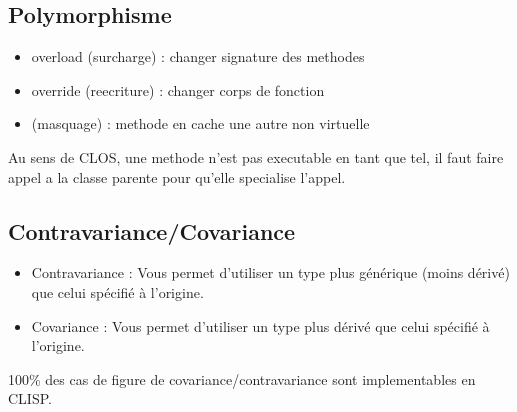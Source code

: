 \documentclass[a4paper,11pt]{article}
\begin{document}
\subsection{Polymorphisme}
\begin{itemize}
  \item overload (surcharge) : changer signature des methodes
  \item override (reecriture) : changer corps de fonction
  \item (masquage) : methode en cache une autre non virtuelle
\end{itemize}

Au sens de CLOS, une methode n'est pas executable en tant que tel, il faut
faire appel a la classe parente pour qu'elle specialise l'appel.\\

\subsection{Contravariance/Covariance}
\begin{itemize}
  \item Contravariance :  Vous permet d'utiliser un type plus générique (moins dérivé) que celui spécifié à l'origine.
  \item Covariance : Vous permet d'utiliser un type plus dérivé que celui spécifié à l'origine. 
\end{itemize}

100\% des cas de figure de covariance/contravariance sont implementables en CLISP.
\end{document}
